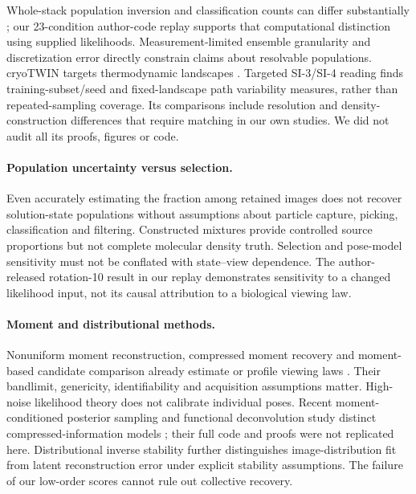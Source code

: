 Whole-stack population inversion and classification counts can differ
substantially \citep{counting2026}; our 23-condition author-code replay
supports that computational distinction using supplied likelihoods.
Measurement-limited ensemble granularity \citep{mattingly2026} and
discretization error \citep{mordant2026} directly constrain claims about
resolvable populations. cryoTWIN targets thermodynamic landscapes
\citep{cryotwin2026}. Targeted SI-3/SI-4 reading finds training-subset/seed
and fixed-landscape path variability measures, rather than repeated-sampling
coverage. Its comparisons include resolution and density-construction
differences that require matching in our own studies. We did not audit
all its proofs, figures or code.

\paragraph{Population uncertainty versus selection.}
Even accurately estimating the fraction among retained images does not
recover solution-state populations without assumptions about particle
capture, picking, classification and filtering. Constructed mixtures
provide controlled source proportions but not complete molecular density
truth. Selection and pose-model sensitivity must not be conflated with
state--view dependence. The author-released rotation-10 result in our replay
demonstrates sensitivity to a changed likelihood input, not its causal
attribution to a biological viewing law.

\paragraph{Moment and distributional methods.}
Nonuniform moment reconstruction, compressed moment recovery and
moment-based candidate comparison already estimate or profile viewing laws
\citep{sharon2020,subspacemom2026,momentmetrics2024}. Their bandlimit,
genericity, identifiability and acquisition assumptions matter. High-noise
likelihood theory \citep{fan2024} does not calibrate individual poses.
Recent moment-conditioned posterior sampling and functional deconvolution
study distinct compressed-information models
\citep{janson2026mps,alghattas2026functional}; their full code and proofs
were not replicated here. Distributional inverse stability
\citep{stochastic2026} further distinguishes image-distribution fit from
latent reconstruction error under explicit stability assumptions.
The failure of our low-order scores cannot rule out collective recovery.


